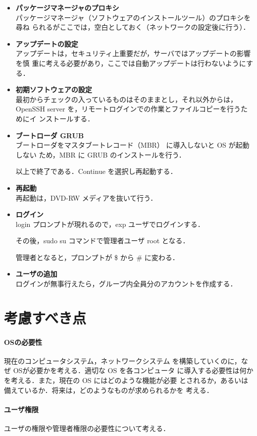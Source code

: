 \begin{itemize}
\item{\bf パッケージマネージャのプロキシ}\\

パッケージマネージャ（ソフトウェアのインストールツール）のプロキシを尋ね
られるがここでは，空白としておく（ネットワークの設定後に行う）．

\item{\bf アップデートの設定}\\

アップデートは，セキュリティ上重要だが，サーバではアップデートの影響を慎
重に考える必要があり，ここでは自動アップデートは行わないようにする．

\item{\bf 初期ソフトウェアの設定}\\

最初からチェックの入っているものはそのままとし，それ以外からは，OpenSSH
     server を，リモートログインでの作業とファイルコピーを行うためにイ
     ンストールする．

\item{\bf ブートローダ GRUB}\\

ブートローダをマスタブートレコード（MBR） に導入しないと OS が起動しない
     ため，MBR に GRUB のインストールを行う．

以上で終了である．Continue を選択し再起動する．

\item{\bf 再起動}\\
再起動は，DVD-RW メディアを抜いて行う．

\item{\bf ログイン}\\
login プロンプトが現れるので，exp ユーザでログインする．

その後，sudo su コマンドで管理者ユーザ root となる．


管理者となると，プロンプトが \$ から \# に変わる．

\item{\bf ユーザの追加}\\
ログインが無事行えたら，グループ内全員分のアカウントを作成する．

\end{itemize}


\section{考慮すべき点}

\paragraph{OSの必要性} 現在のコンピュータシステム，ネットワークシステム
を構築していくのに，なぜ OSが必要かを考える．適切な OS を各コンピュータ
に導入する必要性は何かを考える．また，現在の OS にはどのような機能が必要
とされるか，あるいは備えているか．将来は，どのようなものが求められるかを
考える．

\paragraph{ユーザ権限} ユーザの権限や管理者権限の必要性について考える．

